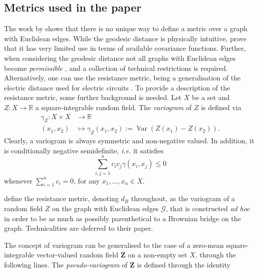 \documentclass[12pt]{article}
\theoremstyle{plain}
\theoremstyle{remark}
\newcommand{\round}[1]{\left( #1 \right)}
\newcommand{\R}[0]{\mathbb{R}}
\newcommand{\ie}{\textit{i.e. }}
\newcommand{\rVec}[1]{{\bm{#1}}}            %
\DeclareMathOperator{\Var}{\mathbb{V}ar}
\begin{document}
\subsection{Metrics used in the paper}
    The work by \cite{anderes_isotropic_2020} shows that there is no unique way to define a metric over a graph with Euclidean edges. While the geodesic distance is physically intuitive, \cite{anderes_isotropic_2020} prove that it has very limited use in terms of available covariance functions. Further, when considering the geodesic distance not all graphs with Euclidean edges become {\em permissible} { \citep{anderes_isotropic_2020}}, and a collection of technical restrictions is required. Alternatively, one can use the resistance metric, being a generalisation of the electric distance used for electric circuits \citep{Klein}. To provide a description of the resistance metric, some further background is needed.
    Let $X$ be a set and $Z:X\to \R$ a square-integrable random {field}. The \emph{variogram} of $Z$ is defined via
    \begin{align}
        \gamma_{{Z}}: X\times X &\to \R \nonumber\\
        (x_1,x_2)&\mapsto \gamma_{{Z}} (x_1,x_2):=\Var\round{{Z}(x_1)-{Z}(x_2)}.\nonumber
    \end{align}
    Clearly, a variogram is always symmetric and non-negative valued. In addition, it is conditionally negative semidefinite, \ie it satisfies \citep{chiles2012geostatistics}
    \begin{equation}
        \sum_{i,j=1}^n c_i c_j \gamma(x_i,x_j) \leq 0
    \end{equation}
    whenever $\sum_{i=1}^n c_i = 0$, for any $x_1,\dots,x_n\in X$. \par 
    \cite{anderes_isotropic_2020} define the resistance metric, denoting $d_R$ throughout, as the variogram of a  {random field} $Z$ on the graph with Euclidean edges $\mathcal G$, that is constructed {\em ad hoc} in order to be as much as possibly parenthetical to a Brownian bridge on the graph. Technicalities are deferred to their paper. \par
    The concept of variogram can be generalised to the case of a zero-mean square-integrable vector-valued  random field $\rVec{Z}$ on a non-empty set $X$, through the following lines. 
    The \emph{pseudo-variogram} of $\rVec{Z}$ is defined through the identity
\end{document}
